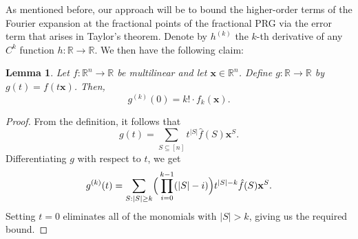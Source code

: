 \documentclass[10pt,a4paper]{article}
\newtheorem{lemma}[theorem]{Lemma}
\theoremstyle{definition}
\begin{document}
As mentioned before, our approach will be to bound the higher-order terms of the Fourier expansion at the fractional points of the fractional PRG via the error term that arises in Taylor's theorem. Denote by $h^{(k)}$ the $k$-th derivative of any $C^k$ function $h:\mathbb{R}\to \mathbb{R}$. We then have the following claim:
    \begin{lemma} 
    \label{lem:derivative}
        Let $f:\mathbb{R}^n \to \mathbb{R}  $ be multilinear and let $\mathbf{x} \in \mathbb{R}^n $. 
        Define $g:\mathbb{R} \to \mathbb{R}$ by $g(t) = f(t \mathbf{x}) $. 
        Then, 
        \begin{equation*}
            g^{(k)}(0) = k! \cdot f_k ( \mathbf{x}). 
        \end{equation*}
    \end{lemma}
    \begin{proof}
        From the definition, it follows that 
        \begin{equation*}
            g( t) = \sum_{S \subseteq [ n ] } t^{\vert S\vert} \hat{f}(S) \mathbf{x}^S.
         \end{equation*}
         Differentiating $g$ with respect to $t$, we get 
         \begin{equation*}
            g^{(k)}(t)=\sum_{S: \vert S\vert  \geq k} \Bigl(\, \prod_{i=0}^{k-1}( \vert S\vert-i) \Bigr) t^{ \vert S\vert -k} \hat{f}(S) \mathbf{x}^{S}. 
         \end{equation*}
         Setting $t = 0$ eliminates all of the monomials with $\vert S\vert > k $, giving us the required bound. 
    \end{proof}
\end{document}
